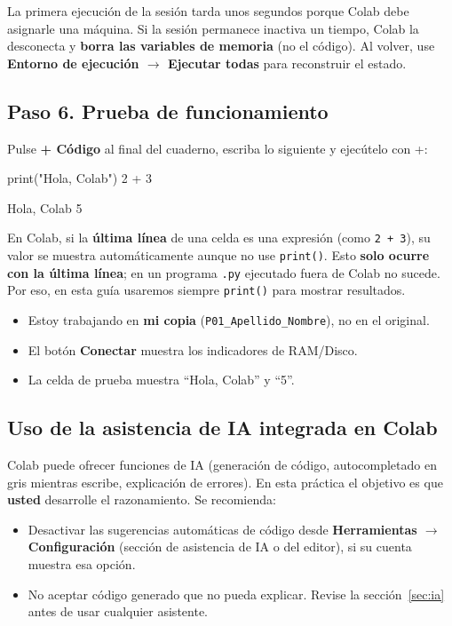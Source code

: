 \documentclass[11pt,a4paper]{article}
\newcommand{\code}[1]{\texttt{#1}}
\newcommand{\menu}[1]{\textbf{\color{moradoOsc}#1}}
\newcommand{\tecla}[1]{\tcbox[on line,boxsep=1pt,left=3pt,right=3pt,top=1pt,bottom=1pt,
  colback=grisClaro,colframe=grafito!60,boxrule=0.5pt,arc=2pt]{\ttfamily\small #1}}
\begin{document}
\begin{warn}
La primera ejecución de la sesión tarda unos segundos porque Colab debe asignarle una máquina. Si la sesión permanece inactiva un tiempo, Colab la desconecta y \textbf{borra las variables de memoria} (no el código). Al volver, use \menu{Entorno de ejecución $\rightarrow$ Ejecutar todas} para reconstruir el estado.
\end{warn}

\subsection{Paso 6. Prueba de funcionamiento}
Pulse \menu{+ Código} al final del cuaderno, escriba lo siguiente y ejecútelo con \tecla{Shift}+\tecla{Enter}:

\begin{codigo}
print("Hola, Colab")
2 + 3
\end{codigo}
\begin{salida}
Hola, Colab
5
\end{salida}

\begin{tip}
En Colab, si la \textbf{última línea} de una celda es una expresión (como \code{2 + 3}), su valor se muestra automáticamente aunque no use \code{print()}. Esto \textbf{solo ocurre con la última línea}; en un programa \code{.py} ejecutado fuera de Colab no sucede. Por eso, en esta guía usaremos siempre \code{print()} para mostrar resultados.
\end{tip}

\begin{verify}
\begin{itemize}[nosep]
  \item[$\square$] Estoy trabajando en \textbf{mi copia} (\code{P01\_Apellido\_Nombre}), no en el original.
  \item[$\square$] El botón \menu{Conectar} muestra los indicadores de RAM/Disco.
  \item[$\square$] La celda de prueba muestra ``Hola, Colab'' y ``5''.
\end{itemize}
\end{verify}

\subsection{Uso de la asistencia de IA integrada en Colab}
Colab puede ofrecer funciones de IA (generación de código, autocompletado en gris mientras escribe, explicación de errores). En esta práctica el objetivo es que \textbf{usted} desarrolle el razonamiento. Se recomienda:
\begin{itemize}
  \item Desactivar las sugerencias automáticas de código desde \menu{Herramientas $\rightarrow$ Configuración} (sección de asistencia de IA o del editor), si su cuenta muestra esa opción.
  \item No aceptar código generado que no pueda explicar. Revise la sección~\ref{sec:ia} antes de usar cualquier asistente.
\end{itemize}
\end{document}
